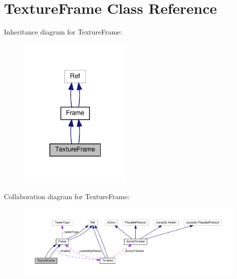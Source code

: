 \hypertarget{classTextureFrame}{}\section{Texture\+Frame Class Reference}
\label{classTextureFrame}


Inheritance diagram for Texture\+Frame\+:
\nopagebreak
\begin{figure}[H]
\begin{center}
\leavevmode
\includegraphics[width=157pt]{classTextureFrame__inherit__graph}
\end{center}
\end{figure}


Collaboration diagram for Texture\+Frame\+:
\nopagebreak
\begin{figure}[H]
\begin{center}
\leavevmode
\includegraphics[width=350pt]{classTextureFrame__coll__graph}
\end{center}
\end{figure}
